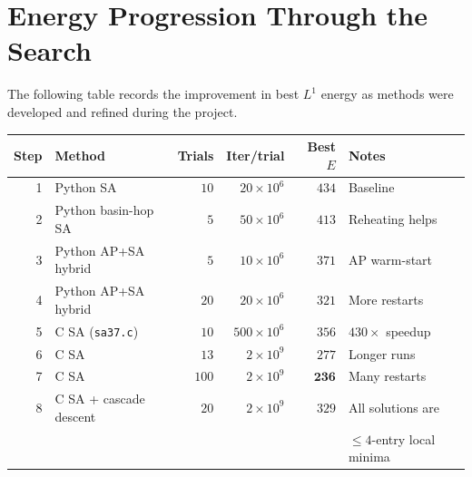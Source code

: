 \documentclass[11pt,a4paper]{article}
\theoremstyle{plain}
\theoremstyle{definition}
\theoremstyle{remark}
\begin{document}
\appendix
\section{Energy Progression Through the Search}

The following table records the improvement in best $L^1$ energy as methods were developed and refined during the project.

\begin{center}
\begin{tabular}{rlrrrl}
\toprule
Step & Method & Trials & Iter/trial & Best $E$ & Notes \\
\midrule
1 & Python SA & $10$ & $20\times10^6$ & $434$ & Baseline \\
2 & Python basin-hop SA & $5$ & $50\times10^6$ & $413$ & Reheating helps \\
3 & Python AP+SA hybrid & $5$ & $10\times10^6$ & $371$ & AP warm-start \\
4 & Python AP+SA hybrid & $20$ & $20\times10^6$ & $321$ & More restarts \\
5 & C SA (\texttt{sa37.c}) & $10$ & $500\times10^6$ & $356$ & $430\times$ speedup \\
6 & C SA & $13$ & $2\times10^9$ & $277$ & Longer runs \\
7 & C SA & $100$ & $2\times10^9$ & $\mathbf{236}$ & Many restarts \\
8 & C SA + cascade descent & $20$ & $2\times10^9$ & $329$ & All solutions are \\
  &                        &     &               &       & $\leq\!4$-entry local minima \\
\bottomrule
\end{tabular}
\end{center}
\end{document}
